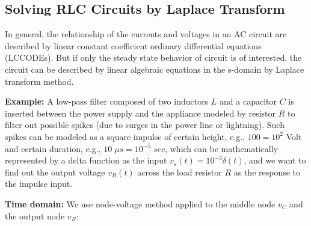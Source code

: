 \documentclass{article}
\begin{document}
\subsection*{Solving RLC Circuits by Laplace Transform}

In general, the relationship of the currents and voltages 
in an AC circuit are described by linear constant coefficient
ordinary differential equations (LCCODEs). But if only the 
steady state behavior of circuit is of interested, the circuit
can be described by linear algebraic equations in the s-domain 
by Laplace transform method. 

{\bf Example:} A low-pass filter composed of two inductors $L$
and a capacitor $C$ is inserted between the power supply and the
appliance modeled by resistor $R$ to filter out possible spikes
(due to surges in the power line or lightning). Such spikes can 
be modeled as a square impulse of certain height, e.g., $100=10^2$
Volt and certain duration, e.g., $10 \;\mu s=10^{-5}\;sec$, which 
can be mathematically represented by a delta function as the input
$v_s(t)=10^{-3}\delta(t)$, and we want to find out the output voltage
$v_R(t)$ across the load resistor $R$ as the response to the impulse
input. 


{\bf Time domain:} We use node-voltage method applied
to the middle node $v_C$ and the output node $v_R$:
\end{document}
